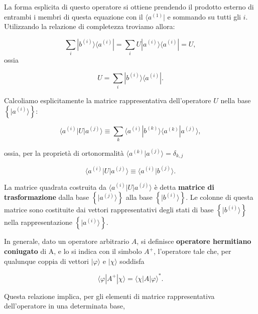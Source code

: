 \documentclass[a4paper,12pt,oneside]{book}
\begin{document}
La forma esplicita di questo operatore si ottiene prendendo il prodotto esterno di entrambi i membri di questa equazione con il $\langle a^{(1)}| $ e sommando su tutti gli $i$. Utilizzando la relazione di completezza troviamo allora:

\begin{equation}
\sum \limits_{i} | b^{(i)} \rangle \langle a^{(i)} |  = \sum \limits_{i} U | a^{(i)} \rangle \langle a^{(i)} |  = U ,
\end{equation}
 ossia
 
\begin{equation}
U = \sum \limits_{i} | b^{(i)} \rangle \langle a^{(i)} | .
\end{equation}

Calcoliamo esplicitamente la matrice rappresentativa dell'operatore $U$ nella base $\left\{ | a^{(i)} \rangle    \right\} $:

\begin{equation}
\langle a^{(i)} | U | a^{(j)} \rangle \equiv \sum \limits_{k} \langle a^{(i)} | b^{(k)} \rangle  \langle a^{(k)} | a^{(j)} \rangle  ,
\end{equation}

ossia, per la proprietà di ortonormalità $\langle a^{(k)} | a^{(j)} \rangle  =\delta_{k,j}$

\begin{equation}
\langle a^{(i)} | U | a^{(j)} \rangle \equiv \langle a^{(i)} | b^{(j)} \rangle .
\end{equation}

La matrice quadrata costruita da $\langle a^{(i)} | U | a^{(j)} \rangle $ è detta \textbf{matrice di trasformazione} dalla base $\left\{ | a^{(j)} \rangle  \right\}$ alla base $\left\{ | b^{(i)} \rangle  \right\}$. Le colonne di questa matrice sono costituite dai vettori rappresentativi degli stati di base $\left\{ | b^{(i)} \rangle  \right\}$ nella rappresentazione $\left\{ | a^{(i)} \rangle  \right\}$.

In generale, dato un operatore arbitrario $A$, si definisce \textbf{operatore hermitiano coniugato} di A, e lo si indica con il simbolo $A^+$, l'operatore tale che, per qualunque coppia di vettori $| \varphi \rangle$ e $ | \chi \rangle $ soddisfa

\begin{equation}
\langle \varphi | A^{+} | \chi \rangle = \langle \chi | A | \varphi \rangle ^* .
\label{cap3_13}
\end{equation}

Questa relazione implica, per gli elementi di matrice rappresentativa dell'operatore in una determinata base,
\end{document}
